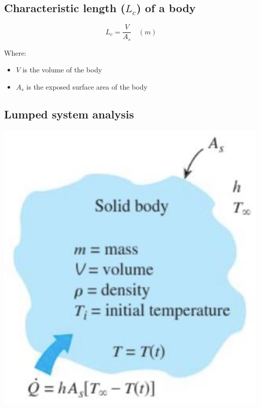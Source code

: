 \documentclass[11pt]{article}
\begin{document}
\subsection{Characteristic length (\(L_c\)) of a body}
\label{sec:org0d20a85}
\[L_c = \frac{V}{A_s} \quad (\unit{m})\]

Where:
\begin{itemize}
\item \(V\) is the volume of the body
\item \(A_s\) is the exposed surface area of the body
\end{itemize}

 \newpage
\subsection{Lumped system analysis}
\label{sec:org92a2f64}
\begin{center}
\includegraphics[width=.9\linewidth]{./images/lumped-system-analysis-diagram.png}
\end{center}
\end{document}
